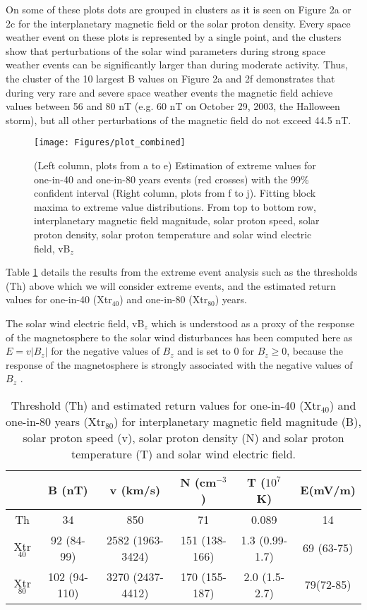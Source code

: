 \documentclass{article}
\begin{document}
On some of these plots dots are grouped in clusters as it is seen on Figure 2a or 2c for the interplanetary magnetic field or the solar proton density. Every space weather event on these plots is represented by a single point, and the clusters show that perturbations of the solar wind parameters during strong space weather events can be significantly larger than during moderate activity. Thus, the cluster of the 10 largest B values on Figure 2a and 2f demonstrates that during very rare and severe space weather events the magnetic field achieve values between 56 and 80 nT (e.g. 60 nT on October 29, 2003, the Halloween storm), but all other perturbations of the magnetic field do not exceed 44.5 nT.

\begin{figure}[h]
	\texttt{[image: Figures/plot\_combined]}
    \caption{(Left column, plots from a to e) Estimation of extreme values for one-in-40 and one-in-80 years events (red crosses) with the 99\% confident interval (Right column, plots from f to j). Fitting block maxima to extreme value distributions. From top to bottom row, interplanetary magnetic field magnitude, solar proton speed, solar proton density, solar proton temperature and solar wind electric field, vB$_{z}$}
    \label{fig:plot_combined}
\end{figure}

Table \ref{tab:extreme_values_s_wind_2} details the results from the extreme event analysis such as the thresholds (Th) above which we will consider extreme events, and the estimated return values for one-in-40 (Xtr$_{40}$) and one-in-80 (Xtr$_{80}$) years.

The solar wind electric field, vB$_{z}$ which is understood as a proxy of the response of the magnetosphere to the solar wind disturbances has been computed here as $E=v|B_{z}|$ for the negative values of $B_{z}$ and is set to $0$ for $B_{z}\ge 0$, because the response of the magnetosphere is strongly associated with the negative values of $B_{z}$  \cite{Gonzalez_1994_Geomagnetic_storms}.


\begin{table}[h]
\centering
\begin{tabular}{cccccc}\toprule
         &B (nT)&v (km/s)&N (cm$^{-3}$)&T ($10^{7}$K)&E(mV/m) \\ \midrule
        Th &34 &850&71&0.089&14 \\
        Xtr$_{40}$&92 (84-99)&2582 (1963-3424)&151 (138-166)&1.3 (0.99-1.7)&69 (63-75) \\
        Xtr$_{80}$&102 (94-110)&3270 (2437-4412)&170 (155-187)&2.0 (1.5-2.7)& 79(72-85) \\
        \bottomrule
\end{tabular}
\caption{Threshold (Th) and estimated return values for one-in-40 (Xtr$_{40}$) and one-in-80 years (Xtr$_{80}$) for interplanetary magnetic field magnitude (B), solar proton speed (v), solar proton density (N) and solar proton temperature (T) and solar wind electric field.}
\label{tab:extreme_values_s_wind_2}
\end{table}
\end{document}
